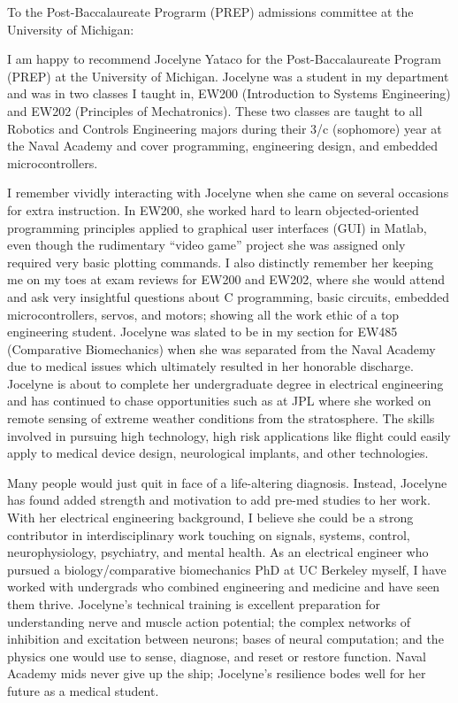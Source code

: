 \documentclass[10pt]{wrceletter}
\date{\today}
\begin{document}
\begin{letter}{%
}

\opening{To the Post-Baccalaureate Prograrm (PREP) admissions committee at the University of Michigan:}
\raggedright %
\setlength{\parindent}{15pt} %

I am happy to recommend Jocelyne Yataco for the Post-Baccalaureate Program (PREP) at the University of Michigan. Jocelyne was a student in my department and was in two classes I taught in, EW200 (Introduction to Systems Engineering) and EW202 (Principles of Mechatronics). These two classes are taught to all Robotics and Controls Engineering majors during their 3/c (sophomore) year at the Naval Academy and cover programming, engineering design, and embedded microcontrollers.  

I remember vividly interacting with Jocelyne when she came on several occasions for extra instruction. In EW200, she worked hard to learn objected-oriented programming principles applied to graphical user interfaces (GUI) in Matlab, even though the rudimentary ``video game'' project she was assigned only required very basic plotting commands. I also distinctly remember her keeping me on my toes at exam reviews for EW200 and EW202, where she would attend and ask very insightful questions about C programming, basic circuits, embedded microcontrollers, servos, and motors; showing all the work ethic of a top engineering student. Jocelyne was slated to be in my section for EW485 (Comparative Biomechanics) when she was separated from the Naval Academy due to medical issues which ultimately resulted in her honorable discharge. Jocelyne is about to complete her undergraduate degree in electrical engineering and has continued to chase opportunities such as at JPL where she worked on remote sensing of extreme weather conditions from the stratosphere. The skills involved in pursuing high technology, high risk applications like flight could easily apply to medical device design, neurological implants, and other technologies.

Many people would just quit in face of a life-altering diagnosis.  Instead, Jocelyne has found added strength and motivation to add pre-med studies to her work. With her electrical engineering background, I believe she could be a strong contributor in interdisciplinary work touching on signals, systems, control, neurophysiology, psychiatry, and mental health. As an electrical engineer who pursued a biology/comparative biomechanics PhD at UC Berkeley myself, I have worked with undergrads who combined engineering and medicine and have seen them thrive. Jocelyne's technical training is excellent preparation for understanding nerve and muscle action potential; the complex networks of inhibition and excitation between neurons; bases of neural computation; and the physics one would use to sense, diagnose, and reset or restore function. Naval Academy mids never give up the ship; Jocelyne's resilience bodes well for her future as a medical student. 


\end{letter}
\end{document}
